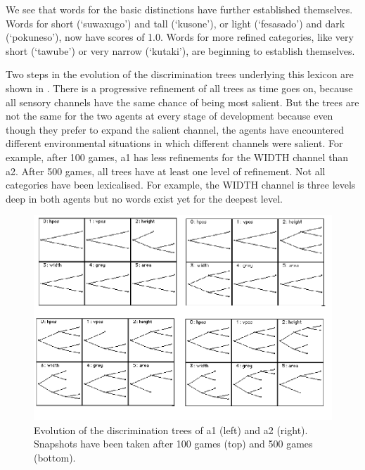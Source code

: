 We see that words for the basic distinctions have further established
themselves. Words for short (`suwaxugo') and tall (`kusone'), or light (`fesasado') and dark 
(`pokuneso'), now have scores of 1.0. Words for more refined categories, like very short (`tawube') or 
very narrow (`kutaki'), are beginning to establish themselves.  

Two steps in the evolution of the discrimination trees
underlying this lexicon are shown in .
There is a progressive refinement 
of all trees as time goes on, 
because all sensory channels have the same chance
of being most salient. But the trees are not 
the same for the two agents at every stage
of development because even though they prefer to expand
the salient channel, the agents have encountered 
different environmental situations in which different
channels were salient. For example, after 100 
games, {\bfshape  a1} has less refinements for the 
WIDTH channel than {\bfshape  a2}. 
After 500 games, all trees 
have at least one level of refinement. Not all 
categories have been lexicalised. For example, the 
WIDTH channel is three levels deep in both 
agents but no words exist yet for the deepest 
level. 


\begin{figure}[htbp]
  \centerline{\includegraphics[width=.65\textwidth]{chap6/figs/gdis}}
\caption{\label{gdis1} Evolution of the discrimination
trees of {\bfshape  a1} (left) and {\bfshape  a2} (right).
Snapshots have been taken after 100 games (top) and 500 
games (bottom).} 
\end{figure}

